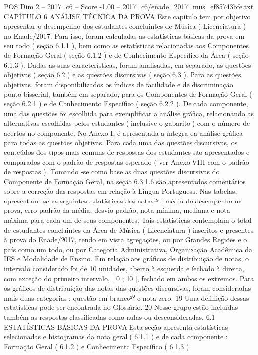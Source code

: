 \begin{textsample}{POS Dim 2 – 2017\_c6 – Score -1.00 – 2017\_c6/enade\_2017\_mus\_ef85743bfe.txt}  \label{ex:f2_pos_274}
CAPÍTULO 6 ANÁLISE TÉCNICA DA PROVA Este capítulo tem por objetivo apresentar o desempenho dos estudantes concluintes de Música ( Licenciatura ) no Enade/2017.
Para isso, foram calculadas as estatísticas básicas da prova em seu todo ( seção 6.1.1 ), bem como as estatísticas relacionadas aos Componentes de Formação Geral ( seção 6.1.2 ) e de Conhecimento Específico da Área ( seção 6.1.3 ).
Dadas as suas características, foram analisadas, em separado, as questões objetivas ( seção 6.2 ) e as questões discursivas ( seção 6.3 ).
Para as questões objetivas, foram disponibilizados os índices de facilidade e de discriminação ponto-bisserial, também em separado, para os Componentes de Formação Geral ( seção 6.2.1 ) e de Conhecimento Específico ( seção 6.2.2 ).
De cada componente, uma das questões foi escolhida para exemplificar a análise gráfica, relacionando as alternativas escolhidas pelos estudantes ( inclusive o gabarito ) com o número de acertos no componente.
No Anexo I, é apresentada a íntegra da análise gráfica para todas as questões objetivas.
Para cada uma das questões discursivas, os conteúdos dos tipos mais comuns de respostas dos estudantes são apresentados e comparados com o padrão de respostas esperado ( ver Anexo VIII com o padrão de respostas ).
Tomando -se como base as duas questões discursivas do Componente de Formação Geral, na seção 6.3.1.6 são apresentados comentários sobre a correção das respostas em relação à Língua Portuguesa.
Nas tabelas, apresentam -se as seguintes estatísticas das notas¹⁹ : média do desempenho na prova, erro padrão da média, desvio padrão, nota mínima, mediana e nota máxima para cada um de seus componentes.
Tais estatísticas contemplam o total de estudantes concluintes da Área de Música ( Licenciatura ) inscritos e presentes à prova do Enade/2017, tendo em vista agregações, ou por Grandes Regiões e o país como um todo, ou por Categoria Administrativa, Organização Acadêmica da IES e Modalidade de Ensino.
Em relação aos gráficos de distribuição de notas, o intervalo considerado foi de 10 unidades, aberto à esquerda e fechado à direita, com exceção do primeiro intervalo, [ 0 ; 10 ], fechado em ambos os extremos.
Para os gráficos de distribuição das notas das questões discursivas, foram consideradas mais duas categorias : questão em branco²⁰ e nota zero. 19 Uma definição dessas estatísticas pode ser encontrada no Glossário. 20 Nesse grupo estão incluídas também as respostas classificadas como nulas ou desconsideradas. 6.1 ESTATÍSTICAS BÁSICAS DA PROVA Esta seção apresenta estatísticas selecionadas e histogramas da nota geral ( 6.1.1 ) e de cada componente : Formação Geral ( 6.1.2 ) e Conhecimento Específico ( 6.1.3 ).

\end{textsample}
